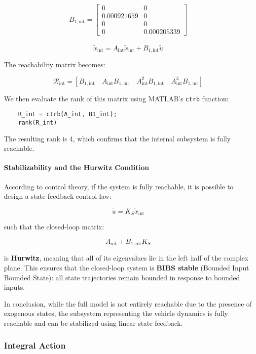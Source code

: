 \documentclass[]{report}
\begin{document}
\[
B_{1,\text{int}} =
\begin{bmatrix}
	0 & 0 \\
	0.000921659 & 0  \\
	0 & 0 \\
	0 & 0.000205339 

\end{bmatrix}
\]

\[
\dot{\tilde{x}}_{\text{int}} = A_{\text{int}} \tilde{x}_{\text{int}} + B_{1,\text{int}} \tilde{u}
\]

The reachability matrix becomes:

\[
\mathcal{R}_{\text{int}} = \left[ B_{1,\text{int}} \quad A_{\text{int}}B_{1,\text{int}} \quad A_{\text{int}}^2B_{1,\text{int}} \quad A_{\text{int}}^3B_{1,\text{int}} \right]
\]

We then evaluate the rank of this matrix using MATLAB's \texttt{ctrb} function:

\begin{verbatim}
	R_int = ctrb(A_int, B1_int);
	rank(R_int)
\end{verbatim}

The resulting rank is 4, which confirms that the internal subsystem is fully reachable.

\paragraph{Stabilizability and the Hurwitz Condition}

According to control theory, if the system is fully reachable, it is possible to design a state feedback control law:

\[
\tilde{u} = K_S \tilde{x}_{\text{int}}
\]

such that the closed-loop matrix:

\[
A_{\text{int}} + B_{1,\text{int}} K_S
\]

is \textbf{Hurwitz}, meaning that all of its eigenvalues lie in the left half of the complex plane. This ensures that the closed-loop system is \textbf{BIBS stable} (Bounded Input Bounded State): all state trajectories remain bounded in response to bounded inputs.

In conclusion, while the full model is not entirely reachable due to the presence of exogenous states, the subsystem representing the vehicle dynamics is fully reachable and can be stabilized using linear state feedback.


\subsubsection{Integral Action}
\end{document}

